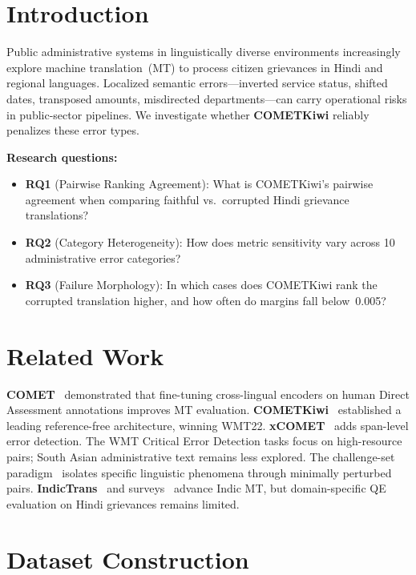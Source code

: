 \documentclass[conference]{IEEEtran}
\begin{document}
\section{Introduction}
Public administrative systems in linguistically diverse environments increasingly
explore machine translation~(MT) to process citizen grievances in Hindi and
regional languages. Localized semantic errors---inverted service status, shifted
dates, transposed amounts, misdirected departments---can carry operational risks
in public-sector pipelines. We investigate whether \textbf{COMETKiwi}
\cite{rei-etal-2022-cometkiwi} reliably penalizes these error types.

\textbf{Research questions:}
\begin{itemize}
  \item \textbf{RQ1} (Pairwise Ranking Agreement): What is COMETKiwi's pairwise
        agreement when comparing faithful vs.\ corrupted Hindi grievance translations?
  \item \textbf{RQ2} (Category Heterogeneity): How does metric sensitivity vary
        across 10 administrative error categories?
  \item \textbf{RQ3} (Failure Morphology): In which cases does COMETKiwi rank the
        corrupted translation higher, and how often do margins fall below~0.005?
\end{itemize}

\section{Related Work}
\textbf{COMET}~\cite{rei-etal-2020-comet} demonstrated that fine-tuning cross-lingual
encoders on human Direct Assessment annotations improves MT evaluation.
\textbf{COMETKiwi}~\cite{rei-etal-2022-cometkiwi} established a leading reference-free
architecture, winning WMT22. \textbf{xCOMET}~\cite{guerreiro-etal-2024-xcomet} adds
span-level error detection. The WMT Critical Error Detection tasks
\cite{specia-etal-2020-findings,specia-etal-2021-findings,zerva-etal-2022-findings}
focus on high-resource pairs; South Asian administrative text remains less explored.
The challenge-set paradigm~\cite{isabelle-etal-2017-challenge,sennrich-2017-grammatical}
isolates specific linguistic phenomena through minimally perturbed pairs.
\textbf{IndicTrans}~\cite{ramesh-etal-2022-indictrans} and
surveys~\cite{haddow-etal-2022-survey} advance Indic MT, but domain-specific QE
evaluation on Hindi grievances remains limited.

\section{Dataset Construction}
\end{document}
